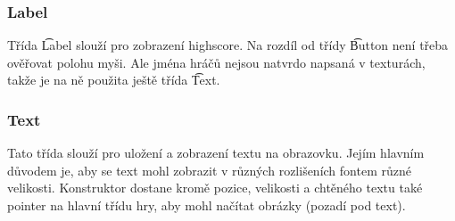 \subsubsection{Label}
Třída \t{Label} slouží pro zobrazení highscore. Na rozdíl od třídy \t{Button} není třeba ověřovat polohu myši. Ale jména hráčů nejsou natvrdo napsaná v texturách, takže je na ně použita ještě třída \t{Text}.
\subsubsection{Text}
Tato třída slouží pro uložení a zobrazení textu na obrazovku. Jejím hlavním důvodem je, aby se text mohl zobrazit v různých rozlišeních fontem různé velikosti. Konstruktor dostane kromě pozice, velikosti a chtěného textu také pointer na hlavní třídu hry, aby mohl načítat obrázky (pozadí pod text).




